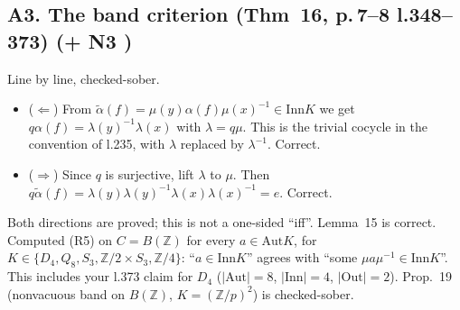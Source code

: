 \documentclass[11pt]{article}
\newcommand{\Z}{\mathbb{Z}}
\newcommand{\Inn}{\mathrm{Inn}}
\newcommand{\Out}{\mathrm{Out}}
\newcommand{\Aut}{\mathrm{Aut}}
\newcommand{\vd}[1]{\fbox{\textbf{#1}}}
\begin{document}
\subsection*{A3. The band criterion (Thm~16, p.\,7--8 l.348--373) \hfill \vd{OK} (+ N3 \vd{SHOULD})}
Line by line, checked-sober.
\begin{itemize}[leftmargin=1.2em]
\item ($\Leftarrow$) From $\tilde\alpha(f)=\mu(y)\alpha(f)\mu(x)^{-1}\in\Inn K$ we get
$q\alpha(f)=\lambda(y)^{-1}\lambda(x)$ with $\lambda=q\mu$. This is the trivial cocycle in the
convention of l.235, with $\lambda$ replaced by $\lambda^{-1}$. Correct.
\item ($\Rightarrow$) Since $q$ is surjective, lift $\lambda$ to $\mu$. Then
$q\tilde\alpha(f)=\lambda(y)\lambda(y)^{-1}\lambda(x)\lambda(x)^{-1}=e$. Correct.
\end{itemize}
Both directions are proved; this is not a one-sided ``iff''. Lemma~15 is correct. Computed (R5) on
$C=B(\Z)$ for every $a\in\Aut K$, for $K\in\{D_4,Q_8,S_3,\Z/2\times S_3,\Z/4\}$: ``$a\in\Inn K$''
agrees with ``some $\mu a\mu^{-1}\in\Inn K$''. This includes your l.373 claim for $D_4$ ($|\Aut|=8$,
$|\Inn|=4$, $|\Out|=2$). Prop.~19 (nonvacuous band on $B(\Z)$, $K=(\Z/p)^2$) is checked-sober.
\end{document}
